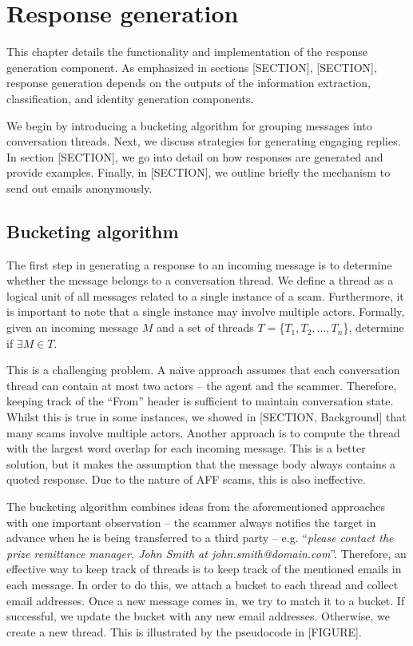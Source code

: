 \chapter{Response generation}

This chapter details the functionality and implementation of the response generation component. As emphasized in sections [SECTION], [SECTION], response generation depends on the outputs of the information extraction, classification, and identity generation components. 

We begin by introducing a bucketing algorithm for grouping messages into conversation threads. Next, we discuss strategies for generating engaging replies. In section [SECTION], we go into detail on how responses are generated and provide examples. Finally, in [SECTION], we outline briefly the mechanism to send out emails anonymously.

\section{Bucketing algorithm}

The first step in generating a response to an incoming message is to determine whether the message belongs to a conversation thread. We define a thread as a logical unit of all messages related to a single instance of a scam. Furthermore, it is important to note that a single instance may involve multiple actors. Formally, given an incoming message $M$ and a set of threads $T = $\{$T_{1}, T_{2}, ..., T_{n}$\}, determine if $\exists M \in T$.
	
This is a challenging problem. A na\"{\i}ve approach assumes that each conversation thread can contain at most two actors -- the agent and the scammer. Therefore, keeping track of the “From” header is  sufficient to maintain conversation state. Whilst this is true in some instances, we showed in [SECTION, Background] that many scams involve multiple actors. Another approach is to compute the thread with the largest word overlap for each incoming message. This is a better solution, but it makes the assumption that the message body always contains a quoted response. Due to the nature of AFF scams, this is also ineffective.

The bucketing algorithm combines ideas from the aforementioned approaches with one important observation -- the scammer always notifies the target in advance when he is being transferred to a third party -- e.g. ``\textit{please contact the prize remittance manager, John Smith at john.smith@domain.com}''. Therefore, an effective way to keep track of threads is to keep track of the mentioned emails in each message. In order to do this, we attach a bucket to each thread and collect email addresses. Once a new message comes in, we try to match it to a bucket. If successful, we update the bucket with any new email addresses. Otherwise, we create a new thread. This is illustrated by the pseudocode in [FIGURE].

